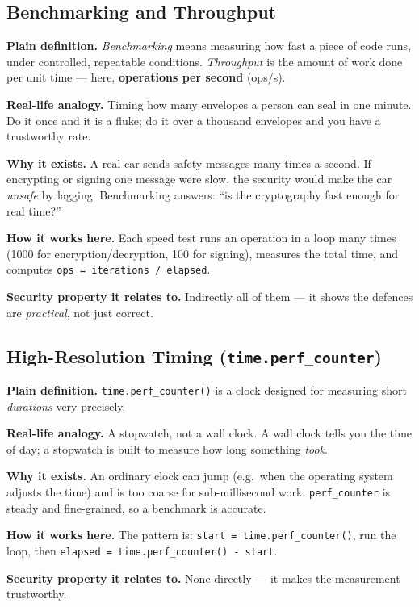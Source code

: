 \documentclass[11pt,a4paper]{article}
\begin{document}
\subsection{Benchmarking and Throughput}
\textbf{Plain definition.} \emph{Benchmarking} means measuring how fast a piece
of code runs, under controlled, repeatable conditions. \emph{Throughput} is the
amount of work done per unit time --- here, \textbf{operations per second}
(ops/s).

\textbf{Real-life analogy.} Timing how many envelopes a person can seal in one
minute. Do it once and it is a fluke; do it over a thousand envelopes and you
have a trustworthy rate.

\textbf{Why it exists.} A real car sends safety messages many times a second. If
encrypting or signing one message were slow, the security would make the car
\emph{unsafe} by lagging. Benchmarking answers: ``is the cryptography fast enough
for real time?''

\textbf{How it works here.} Each speed test runs an operation in a loop many
times (1000 for encryption/decryption, 100 for signing), measures the total time,
and computes \texttt{ops = iterations / elapsed}.

\textbf{Security property it relates to.} Indirectly all of them --- it shows the
defences are \emph{practical}, not just correct.

\subsection{High-Resolution Timing (\texttt{time.perf\_counter})}
\textbf{Plain definition.} \texttt{time.perf\_counter()} is a clock designed for
measuring short \emph{durations} very precisely.

\textbf{Real-life analogy.} A stopwatch, not a wall clock. A wall clock tells you
the time of day; a stopwatch is built to measure how long something \emph{took}.

\textbf{Why it exists.} An ordinary clock can jump (e.g.\ when the operating
system adjusts the time) and is too coarse for sub-millisecond work.
\texttt{perf\_counter} is steady and fine-grained, so a benchmark is accurate.

\textbf{How it works here.} The pattern is: \texttt{start = time.perf\_counter()},
run the loop, then \texttt{elapsed = time.perf\_counter() - start}.

\textbf{Security property it relates to.} None directly --- it makes the
measurement trustworthy.
\end{document}
